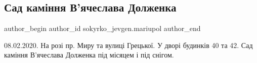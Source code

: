  
 
 
 
 

\subsection{Сад каміння В'ячеслава Долженка}
\label{sec:09_02_2023.fb.sokyrko_jevgen.mariupol.1.sad_kam_nnya_v_yache}

\ifcmt
 author_begin
   author_id sokyrko_jevgen.mariupol
 author_end
\fi

08.02.2020. На розі пр. Миру та вулиці Грецької. У дворі будинків 40 та 42. Сад
каміння В'ячеслава Долженка під місяцем і під снігом.

